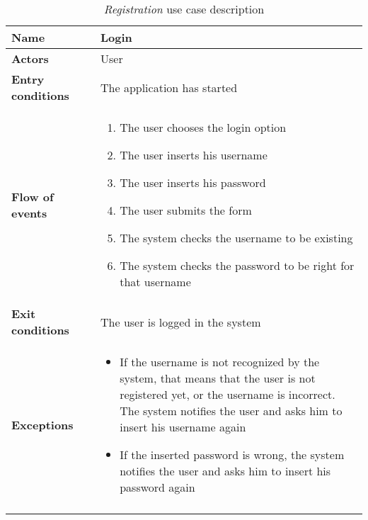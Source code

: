 		\begin{longtable}{p{0.25\linewidth}p{0.75\linewidth}}
			\toprule
			\textbf{Name} & \textbf{Login} \\
			\midrule
			\textbf{Actors} & User \\
			\midrule
			\textbf{Entry conditions} & The application has started \\
			\midrule
			\textbf{Flow of events} & 
			\begin{enumerate}
				\item The user chooses the login option
				\item The user inserts his username
				\item The user inserts his password
				\item The user submits the form
				\item The system checks the username to be existing
				\item The system checks the password to be right for that username
			\end{enumerate} \\
			\midrule
			\textbf{Exit conditions} & The user is logged in the system\\
			\midrule
			\textbf{Exceptions} & 
			\begin{itemize}
				\item If the username is not recognized by the system, that means that the user is not registered yet, or the username is incorrect. The system notifies the user and asks him to insert his username again
				\item If the inserted password is wrong, the system notifies the user and asks him to insert his password again			
			\end{itemize} \\
			\bottomrule
			\caption{\emph{Registration} use case description}
		\end{longtable}
	
